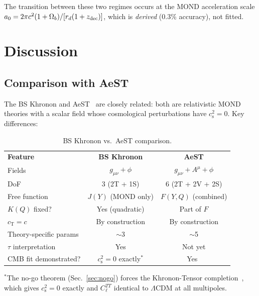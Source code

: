 \documentclass[prd,twocolumn,superscriptaddress,longbibliography,floatfix]{revtex4-2}
\newcommand{\tauasym}{\tau}
\newcommand{\cs}{c_{\mathrm{s}}}
\newcommand{\cT}{c_{\mathrm{T}}}
\begin{document}
The transition between these two regimes occurs at the MOND
acceleration scale $a_0 = 2\pi c^2(1+\Omega_b)/[r_d(1+z_{\rm dec})]$,
which is \emph{derived} (0.3\% accuracy), not fitted.


\section{Discussion}
\label{sec:discussion}

\subsection{Comparison with AeST}

The BS Khronon and AeST~\cite{SZ2021prl,SZ2021extended,SV2024,Bataki2023}
are closely related: both are relativistic MOND theories with
a scalar field whose cosmological perturbations have $\cs^2 = 0$.
Key differences:

\begin{table}[b]
\caption{\label{tab:comparison}BS Khronon vs.\ AeST comparison.}
\begin{ruledtabular}
\begin{tabular}{lcc}
\textbf{Feature} & \textbf{BS Khronon} & \textbf{AeST} \\
\colrule
Fields & $g_{\mu\nu} + \phi$ & $g_{\mu\nu} + A^\mu + \phi$ \\
DoF & 3 (2T + 1S) & 6 (2T + 2V + 2S) \\
Free function & $J(Y)$ (MOND only) & $F(Y,Q)$ (combined) \\
$K(Q)$ fixed? & Yes (quadratic) & Part of $F$ \\
$\cT = c$ & By construction & By construction \\
Theory-specific params & $\sim$3 & $\sim$5 \\
$\tauasym$ interpretation & Yes & Not yet \\
CMB fit demonstrated? & $\cs^2 = 0$ exactly$^*$ & Yes~\cite{SZ2021prl} \\
\end{tabular}
\end{ruledtabular}
\end{table}

$^*$The no-go theorem (Sec.~\ref{sec:nogo}) forces the Khronon-Tensor
completion~\cite{BS2025}, which gives $\cs^2 = 0$ exactly and
$C_\ell^{TT}$ identical to $\Lambda$CDM at all multipoles.
\end{document}
